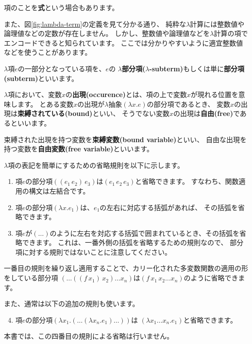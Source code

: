項のことを\textbf{式}という場合もあります。

また、図\ref{fig:lambda-term}の定義を見て分かる通り、
純粋な$\lambda$計算には整数値や論理値などの定数が存在しません。
しかし、整数値や論理値などを$\lambda$計算の項でエンコードできると知られています。
ここでは分かりやすいように適宜整数値などを使うことがあります。

$\lambda$項$e$の一部分となっている項を、$e$の
\textbf{$\lambda$部分項($\lambda$-subterm)}もしくは単に\textbf{部分項(subterm)}といいます。

$\lambda$項において、変数$x$の\textbf{出現(occurence)}とは、項の上で変数$x$が現れる位置を意味します。
とある変数$x$の出現が$\lambda$抽象$(\lambda x . e)$の部分項であるとき、
変数$x$の出現は\textbf{束縛されている(bound)}といい、
そうでない変数$x$の出現は\textbf{自由(free)}であるといいます。

束縛された出現を持つ変数を\textbf{束縛変数(bound variable)}といい、
自由な出現を持つ変数を\textbf{自由変数(free variable)}といいます。

$\lambda$項の表記を簡単にするための省略規則を以下に示します。

\begin{enumerate}
  \item 項$e$の部分項$((e_1 \, e_2) \, e_3)$は$(e_1 \, e_2 \, e_3)$と省略できます。
        すなわち、関数適用の構文は左結合です。
  \item 項$e$の部分項$(\lambda x . e_1)$は、$e_1$の左右に対応する括弧があれば、
        その括弧を省略できます。
  \item 項$e$が$(\dots)$のように左右を対応する括弧で囲まれているとき、その括弧を省略できます。
        これは、一番外側の括弧を省略するための規則なので、
        部分項に対する規則ではないことに注意してください。
\end{enumerate}

一番目の規則を繰り返し適用することで、カリー化された多変数関数の適用の形をしている部分項
$(\dots((f \, x_1) \, x_2) \dots x_n)$は$(f \, x_1 \, x_2 \dots x_n)$のように省略できます。

また、通常は以下の追加の規則も使います。

\begin{enumerate}
  \setcounter{enumi}{3}
  \item 項$e$の部分項$(\lambda x_1. (\dots (\lambda x_n . e_1) \dots))$は
       $(\lambda x_1 \dots x_n . e_1)$と省略できます。
\end{enumerate}

本書では、この四番目の規則による省略は行いません。

